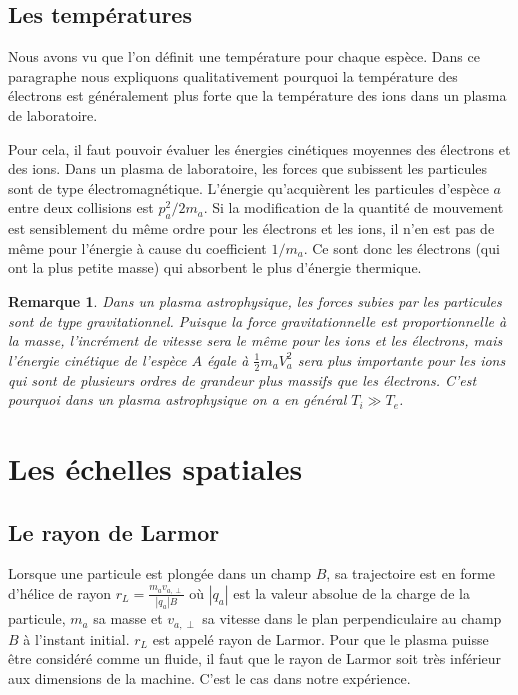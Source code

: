 \documentclass{book}
\newtheorem{rem}{Remarque}[chapter]
\begin{document}
\subsection{Les temp\'eratures}
Nous avons vu que l'on d\'efinit une temp\'erature pour chaque
esp\`ece. Dans ce paragraphe nous expliquons qualitativement
pourquoi la temp\'erature des \'electrons est g\'en\'eralement plus
forte que la 
temp\'erature des ions dans un plasma de laboratoire.

Pour cela, il faut
pouvoir \'evaluer les \'energies cin\'etiques moyennes des \'electrons
et des 
ions. Dans un plasma de laboratoire, les forces que subissent les
particules sont de type \'electromagn\'etique. L'\'energie qu'acqui\`erent
les particules d'esp\`ece $a$ entre deux collisions est $p_a^2/2m_a$. Si
la modification de la quantit\'e de mouvement est sensiblement du m\^eme
ordre pour les \'electrons et les ions, il n'en est pas de m\^eme pour
l'\'energie \`a cause du coefficient $1/m_a$. Ce sont donc les
\'electrons (qui ont la plus petite masse) qui absorbent le plus
d'\'energie thermique.



\begin{rem}
Dans un plasma astrophysique, les forces subies par les particules
sont de type gravitationnel. Puisque la force gravitationnelle est
proportionnelle  \`a la
masse, l'incr\'ement de vitesse sera le m\^eme pour les ions et les
\'electrons, mais l'\'energie cin\'etique de l'esp\`ece $A$ \'egale \`a
$\frac{1}{2} m_a V_a^2$ sera plus importante pour les ions qui sont de
plusieurs ordres de grandeur plus massifs que les \'electrons. C'est
pourquoi dans un plasma astrophysique on a en g\'en\'eral $T_i\gg T_e$. 
\end{rem}





\section{Les \'echelles spatiales}

\subsection{Le rayon de Larmor}
Lorsque une particule est plong\'ee dans un champ $B$, sa trajectoire
est en forme d'h\'elice de rayon $r_L=\frac{m_av_{a,\perp}}{|q_a|B}$ o\`u
$|q_a|$ est la valeur absolue  de la charge de la particule, $m_a$ sa
masse et 
$v_{a,\perp}$ sa vitesse dans le plan perpendiculaire au champ $B$ \`a
l'instant initial. $r_L$ est appel\'e rayon de Larmor.
Pour que le plasma puisse \^etre consid\'er\'e
 comme un fluide, il faut que le rayon de Larmor soit tr\`es
inf\'erieur aux dimensions de la machine. C'est le cas dans notre
exp\'erience. 
\end{document}
